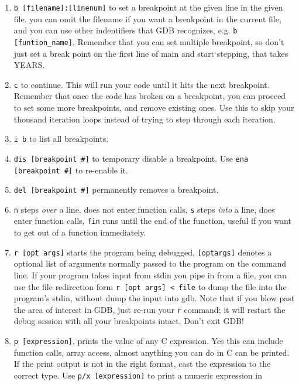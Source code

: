\documentclass[11pt]{article}
\begin{document}
\begin{enumerate}
    \item \texttt{b [filename]:[linenum]} to set a breakpoint at the given line in the
        given file. you can omit the filename if you want a breakpoint in the current
        file, and you can use other indentifiers that GDB recognizes, e.g. \texttt{b
        [funtion\_name]}. Remember that you can set multiple breakpoint, so don't just set
        a break point on the first line of main and start stepping, that takes YEARS.
    \item \texttt{c} to continue. This will run your code until it hits the next
        breakpoint. Remember that once the code has broken on a breakpoint, you can
        proceed to set some more breakpoints, and remove existing ones. Use this to skip
        your thousand iteration loops instead of trying to step through each iteration.
    \item \texttt{i b} to list all breakpoints.
    \item \texttt{dis [breakpoint \#]} to temporary disable a breakpoint. Use \texttt{ena
        [breakpoint \#]} to re-enable it.
    \item \texttt{del [breakpoint \#]} permanently removes a breakpoint.
    \item \texttt{n} steps \emph{over} a line, does not enter function calls, \texttt{s}
        steps \emph{into} a line, does enter function calls, \texttt{fin} runs until the
        end of the function, useful if you want to get out of a function immediately.
    \item \texttt{r [opt args]} starts the program being debugged, \texttt{[optargs]}
        denotes a optional list of arguments normally passed to the program on the command
        line. If your program takes input from stdin you pipe in from a file, you can use
        the file redirection form \texttt{r [opt args] < file} to dump the file into
        the program's stdin, without dump the input into gdb. Note that if you blow past
        the area of interest in GDB, just re-run your \texttt{r} command; it will restart
        the debug session with all your breakpoints intact. Don't exit GDB!
    \item \texttt{p [expression]}, prints the value of any C expression. Yes this can
        include function calls, array access, almost anything you can do in C can be
        printed. If the print output is not in the right format, cast the expression to
        the correct type. Use \texttt{p/x [expression]} to print a numeric expression in

\end{enumerate}
\end{document}

